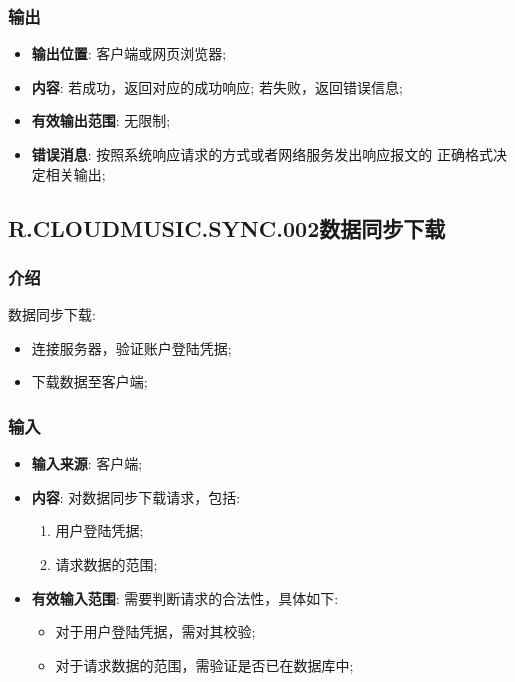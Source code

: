 \subsubsection{输出}
\begin{itemize}
	\item \textbf{输出位置}: 客户端或网页浏览器;
	\item \textbf{内容}: 若成功，返回对应的成功响应; 若失败，返回错误信息;
	\item \textbf{有效输出范围}: 无限制;
	\item \textbf{错误消息}: 按照系统响应请求的方式或者网络服务发出响应报文的
		正确格式决定相关输出;
\end{itemize}

\subsection{R.CLOUDMUSIC.SYNC.002数据同步下载}
\subsubsection{介绍}
	数据同步下载:
	\begin{itemize}
		\item 连接服务器，验证账户登陆凭据;
		\item 下载数据至客户端;
	\end{itemize}
\subsubsection{输入}
	\begin{itemize}
		\item \textbf{输入来源}: 客户端;
		\item \textbf{内容}: 对数据同步下载请求，包括: 
		\begin{enumerate}
			\item 用户登陆凭据;
			\item 请求数据的范围;
		\end{enumerate}
		\item \textbf{有效输入范围}: 需要判断请求的合法性，具体如下: 
		\begin{itemize}
			\item 对于用户登陆凭据，需对其校验; 
			\item 对于请求数据的范围，需验证是否已在数据库中; 
		\end{itemize}
	\end{itemize}
